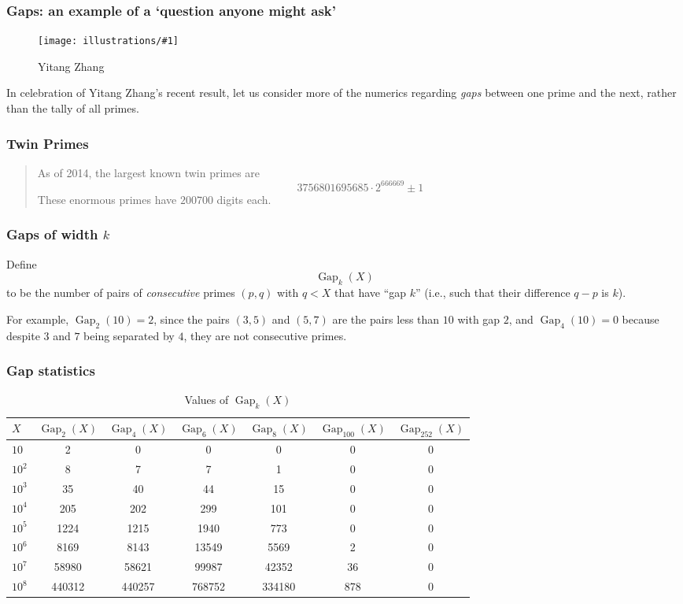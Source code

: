 \documentclass{beamer}
\DeclareMathOperator{\Gap}{Gap}
\newcommand{\ill}[3]{%
   \begin{figure}[H]%
   \vspace{-2ex}
   \centering%
   \texttt{[image: illustrations/\#1]}%
   \caption{#3}%
   \vspace{-2ex}
    \end{figure}}
\begin{document}
\begin{frame}\frametitle{\bf Gaps: an example of a `question anyone might ask'}
\vskip10pt

\ill{zhang}{0.15}{Yitang Zhang\label{fig:zhang}}


In celebration of Yitang Zhang's recent result, let us consider more of the numerics
regarding {\em gaps} between one prime and the next, rather than the tally
of all primes.
\end{frame}\begin{frame}\frametitle{\bf Twin Primes}

\begin{quote} As of 2014, the largest known twin primes are
$$3756801695685\cdot 2^{666669} \pm 1$$
These enormous primes have $200700$ digits each.
\end{quote}
\end{frame}
\begin{frame}\frametitle{\bf Gaps of width $k$}
Define
{\Huge $$
  \Gap_{k}(X)
$$}
to be the number of pairs of {\em consecutive} primes $(p,q)$ with
$q<X$ that have ``gap $k$'' (i.e., such that their difference $q-p$ is
$k$). 

\vskip20pt

For example, $\Gap_2(10) = 2$, since the pairs
$(3,5)$ and $(5,7)$ are the pairs less than $10$ with gap $2$,
and $\Gap_{4}(10)=0$ because despite $3$ and $7$ being separated
by $4$, they are not consecutive primes.\end{frame}
\begin{frame}\frametitle{\bf Gap statistics}


\begin{table}[H]\centering
\caption{Values of $\Gap_{k}(X)$ \label{tab:gap}}
\vspace{1em}

{\small
\begin{tabular}{|l|c|c|c|c|c|c|}\hline
$X$ & $\Gap_{2}(X)$ & $\Gap_{4}(X)$& $\Gap_{6}(X)$ & $\Gap_{8}(X)$ &
 $\Gap_{100}(X)$ &   $\Gap_{252}(X)$\\\hline

$10$ & 2 & 0 & 0 & 0 & 0 & 0\\\hline
$10^{2}$ & 8 & 7 & 7 & 1 & 0 & 0\\\hline
$10^{3}$ & 35 & 40 & 44 & 15 & 0 & 0\\\hline
$10^{4}$ & 205 & 202 & 299 & 101 & 0 & 0\\\hline
$10^{5}$ & 1224 & 1215 & 1940 & 773 & 0 & 0\\\hline
$10^{6}$ & 8169 & 8143 & 13549 & 5569 & 2 & 0\\\hline
$10^{7}$ & 58980 & 58621 & 99987 & 42352 & 36 & 0\\\hline
$10^{8}$ & 440312 & 440257 & 768752 & 334180 & 878 & 0\\\hline

\end{tabular}
}
\end{table}
\end{frame}
\end{document}
